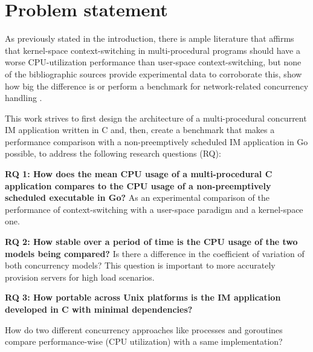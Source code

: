 \section{Problem statement}
As previously stated in the introduction, there is ample literature that affirms that kernel-space context-switching in multi-procedural programs should have a worse CPU-utilization performance than user-space context-switching, but none of the bibliographic sources provide experimental data to corroborate this, show how big the difference is or perform a benchmark for network-related concurrency handling \cite{2003Events}\cite{2005Threads}\cite{2013ContextSwitching}\cite{Cox-Buday2017}\cite{Kerrisk2010}.

This work strives to first design the architecture of a multi-procedural concurrent IM application written in C and, then, create a benchmark that makes a performance comparison with a non-preemptively scheduled IM application in Go possible, to address the following research questions (RQ):

\textbf{RQ 1: How does the mean CPU usage of a multi-procedural C application compares to the CPU usage of a non-preemptively scheduled executable in Go?} As an experimental comparison of the performance of context-switching with a user-space paradigm and a kernel-space one.

\textbf{RQ 2: How stable over a period of time is the CPU usage of the two models being compared?} Is there a difference in the coefficient of variation of both concurrency models? This question is important to more accurately provision servers for high load scenarios.

\textbf{RQ 3: How portable across Unix platforms is the IM application developed in C with minimal dependencies?}

How do two different concurrency approaches like processes and goroutines compare performance-wise (CPU utilization) with a same implementation?



